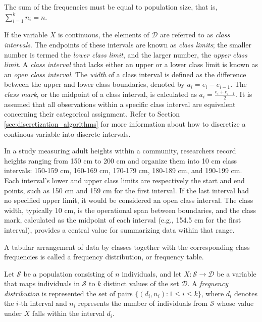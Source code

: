 The sum of the frequencies must be equal to population size, that is, $\sum_{i=1}^k n_i = n$.

If the variable $X$ is continuous, the elements of $\mathcal{D}$ are referred to as \emph{class intervals}. The endpoints of these intervals are known as \emph{class limits}; the smaller number is termed the \emph{lower class limit}, and the larger number, the \emph{upper class limit}. A \emph{class interval} that lacks either an upper or a lower class limit is known as an \emph{open class interval}. The \emph{width} of a class interval is defined as the difference between the upper and lower class boundaries, denoted by $a_i = e_i - e_{i-1}$. The \emph{class mark}, or the midpoint of a class interval, is calculated as $a_i = \frac{e_i + e_{i-1}}{2}$. It is assumed that all observations within a specific class interval are equivalent concerning their categorical assignment. Refer to Section \ref{sec:discretization_algorithms} for more information about how to discretize a continous variable into discrete intervals.

\begin{example}
In a study measuring adult heights within a community, researchers record heights ranging from 150 cm to 200 cm and organize them into 10 cm class intervals: 150-159 cm, 160-169 cm, 170-179 cm, 180-189 cm, and 190-199 cm. Each interval's lower and upper class limits are respectively the start and end points, such as 150 cm and 159 cm for the first interval. If the last interval had no specified upper limit, it would be considered an open class interval. The class width, typically 10 cm, is the operational span between boundaries, and the class mark, calculated as the midpoint of each interval (e.g., 154.5 cm for the first interval), provides a central value for summarizing data within that range.
\end{example}

A tabular arrangement of data by classes together with the corresponding class frequencies is called a frequency distribution, or frequency table.

\begin{definition}
Let $\mathcal{S}$ be a population consisting of $n$ individuals, and let $X: \mathcal{S} \rightarrow \mathcal{D}$ be a variable that maps individuals in $\mathcal{S}$ to $k$ distinct values of the set $\mathcal{D}$. A \emph{frequency distribution} is represented the set of pairs $\{(d_i, n_i) : 1 \leq i \leq k\}$, where $d_i$ denotes the $i$-th interval and $n_i$ represents the number of individuals from $\mathcal{S}$ whose value under $X$ falls within the interval $d_i$.
\end{definition}

